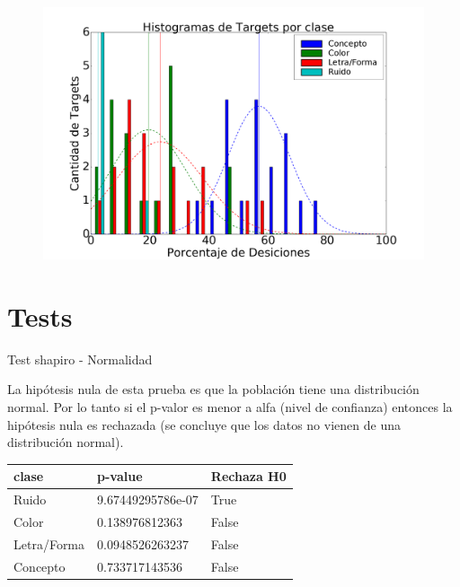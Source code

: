 \documentclass{beamer}
\begin{document}
\begin{frame}
\begin{figure}[c]
 \centering
  \begin{minipage}[c]{1\textwidth}
	\centering	
	\includegraphics[scale=0.27]{hist_targets.png}
  \end{minipage}
\end{figure}
\end{frame}

\section{Tests}

\begin{frame}{Test shapiro - Normalidad}

La hipótesis nula de esta prueba es que la población tiene una distribución normal. Por lo tanto si el p-valor es menor a alfa (nivel de confianza) entonces la hipótesis nula es rechazada (se concluye que los datos no vienen de una distribución normal).

\begin{center}
    \begin{tabular}{ | p{2cm} | p{3.5cm} | p{2cm} |}
    \hline
     clase       &  p-value               & Rechaza H0		\\ 
    \hline
     Ruido       &  9.67449295786e-07     & True 				\\ 
     Color       &  0.138976812363   	  &	False				\\ 
     Letra/Forma &  0.0948526263237       & False 				\\ 
	 Concepto    &  0.733717143536   	  &	False			\\ 
    \hline
    \end{tabular}
\end{center} 

\end{frame}
\end{document}
